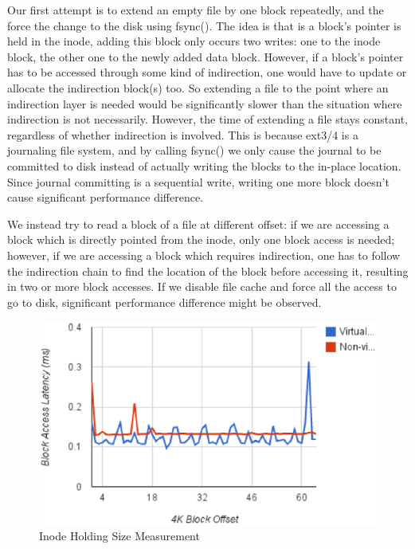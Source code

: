 Our first attempt is to extend an empty file by one block repeatedly, and the force the change to the disk using fsync(). The idea is that is a block's pointer is held in the inode, adding this block only occurs two writes: one to the inode block, the other one to the newly added data block. However, if a block's pointer has to be accessed through some kind of indirection, one would have to update or allocate the indirection block(s) too. So extending a file to the point where an indirection layer is needed would be significantly slower than the situation where indirection is not necessarily. However, the time of extending a file stays constant, regardless of whether indirection is involved. This is because ext3/4 is a journaling file system, and by calling fsync() we only cause the journal to be committed to disk instead of actually writing the blocks to the in-place location. Since journal committing is a sequential write, writing one more block doesn't cause significant performance difference.

We instead try to read a block of a file at different offset: if we are accessing a block which is directly pointed from the inode, only one block access is needed; however, if we are accessing a block which requires indirection, one has to follow the indirection chain to find the location of the block before accessing it, resulting in two or more block accesses. If we disable file cache and force all the access to go to disk, significant performance difference might be observed. 

\begin{figure}
\centering
\includegraphics[width=.65\textwidth]{figures/indirect.eps}
\caption{Inode Holding Size Measurement}
\label{fig:indirect}
\end{figure}

